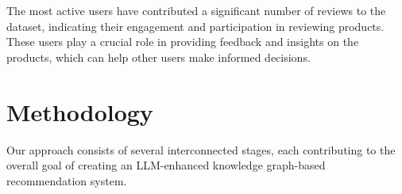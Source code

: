 \documentclass{article}
\begin{document}


The most active users have contributed a significant number of reviews to the dataset, indicating their engagement and participation in reviewing products. These users play a crucial role in providing feedback and insights on the products, which can help other users make informed decisions.


\section{Methodology}
Our approach consists of several interconnected stages, each contributing to the overall goal of creating an LLM-enhanced knowledge graph-based recommendation system.
\end{document}
